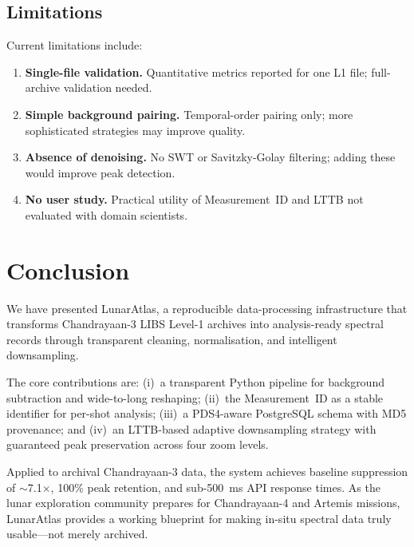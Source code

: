 \documentclass[a4paper,twocolumn,10pt]{article}
\begin{document}
\subsection{Limitations}

Current limitations include:

\begin{enumerate}[nosep,leftmargin=*]
  \item \textbf{Single-file validation.}  Quantitative metrics reported
    for one L1 file; full-archive validation needed.
  \item \textbf{Simple background pairing.}  Temporal-order pairing
    only; more sophisticated strategies may improve quality.
  \item \textbf{Absence of denoising.}  No SWT or Savitzky-Golay
    filtering; adding these would improve peak detection.
  \item \textbf{No user study.}  Practical utility of Measurement~ID
    and LTTB not evaluated with domain scientists.
\end{enumerate}


\section{Conclusion}
\label{sec:conclusion}

We have presented LunarAtlas, a reproducible data-processing
infrastructure that transforms Chandrayaan-3 LIBS Level-1 archives
into analysis-ready spectral records through transparent cleaning,
normalisation, and intelligent downsampling.

The core contributions are: (i)~a transparent Python pipeline for
background subtraction and wide-to-long reshaping; (ii)~the
Measurement~ID as a stable identifier for per-shot analysis;
(iii)~a PDS4-aware PostgreSQL schema with MD5 provenance; and
(iv)~an LTTB-based adaptive downsampling strategy with guaranteed
peak preservation across four zoom levels.

Applied to archival Chandrayaan-3 data, the system achieves baseline
suppression of $\sim$7.1$\times$, 100\% peak retention, and
sub-\SI{500}{\milli\second} API response times.  As the lunar
exploration community prepares for Chandrayaan-4 and Artemis missions,
LunarAtlas provides a working blueprint for making in-situ spectral
data truly usable---not merely archived.
\end{document}
